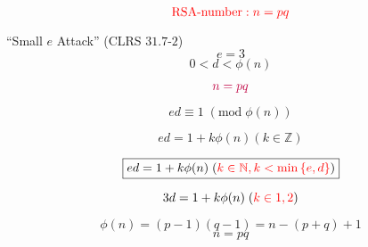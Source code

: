 \begin{frame}
  \[
	\textcolor{red}{\text{RSA-number}: n = p q}
  \]

\end{frame}

\begin{frame}
  \begin{exampleblock}{``Small $e$ Attack'' (CLRS $31.7$-$2$)}
	\[
	  e = 3
	\]
	\[
	  0 < d < \phi(n)
	\]

	\pause
	\vspace{-0.30cm}
	\[
	  \textcolor{purple}{n = pq}
	\]
  \end{exampleblock}

  \pause
  \begin{center}
  \end{center}

  \pause
  \begin{center}
  \end{center}
  \end{frame}

\begin{frame}
  \[
	ed \equiv 1 \;(\text{mod}\; \phi(n))
  \]

  \pause
  \[
	ed = 1 + k \phi(n) (k \in \mathbb{Z})
  \]

  \pause
  \[
	\boxed{ed = 1 + k \phi(n) \;(\textcolor{red}{k \in \mathbb{N}, k < \min\left\{ e, d \right\}})}
  \]

  \pause
  \[
	3d = 1 + k \phi(n) \;(\textcolor{red}{k \in {1, 2}})
  \]

  \pause
  \[
	\phi(n) = (p-1)(q-1) = n - (p + q) + 1
  \]
  \[
	n = pq
  \]
\end{frame}


